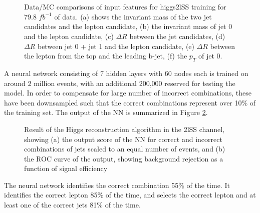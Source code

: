 \begin{figure}[H]
    \centering
    \\
    \\
    \caption{Data/MC comparisons of input features for higgs2lSS training for 79.8 $fb^{-1}$ of data. (a) shows the invariant mass of the two jet candidates and the lepton candidate, (b) the invariant mass of jet 0 and the lepton candidate, (c) $\Delta R$ between the jet candidates, (d) $\Delta R$ between jet 0 + jet 1 and the lepton candidate, (e) $\Delta R$ between the lepton from the top and the leading b-jet, (f) the $p_T$ of jet 0.}
    \label{fig:model_higgs2lSS}
\end{figure}

A neural network consisting of 7 hidden layers with 60 nodes each is trained on around 2 million events, with an additional 200,000 reserved for testing the model. In order to compensate for large number of incorrect combinations, these have been downsampled such that the correct combinations represent over 10\% of the training set. The output of the NN is summarized in Figure \ref{fig:higgs2lSSresults}.

\begin{figure}[H]
    \centering
  \label{fig:higgs2lSSresults}
  \caption{Result of the Higgs reconstruction algorithm in the 2lSS channel, showing (a) the output score of the NN for correct and incorrect combinations of jets scaled to an equal number of events, and (b) the ROC curve of the output, showing background rejection as a function of signal efficiency}
\end{figure} 

The neural network identifies the correct combination 55\% of the time. It identifies the correct lepton 85\% of the time, and selects the correct lepton and at least one of the correct jets 81\% of the time.


